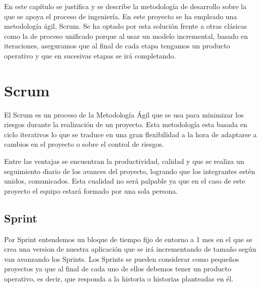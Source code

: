 En este capítulo se justifica y se describe la metodología de desarrollo sobre la que se apoya el proceso de ingeniería. En este proyecto se ha empleado una metodología ágil, Scrum. Se ha optado por esta solución frente a otras clásicas como la de proceso unificado porque al usar un modelo incremental, basado en iteraciones, aseguramos que al final de cada etapa tengamos un producto operativo y que en sucesivas etapas se irá completando.



\section{Scrum}

El Scrum es un proceso de la Metodología Ágil que se usa para minimizar los riesgos durante la realización de un proyecto. 
Esta metodología esta basada en ciclo iterativos lo que se traduce en una gran flexibilidad a la hora de adaptarse a cambios en el proyecto o sobre el control de riesgos. 



Entre las ventajas se encuentran la productividad, calidad y que se realiza un seguimiento diario de los avances del proyecto, logrando que los integrantes estén unidos, comunicados. Esta cualidad no será palpable ya que en el caso de este proyecto el equipo estará formado por una sola persona.\\

\subsection{Sprint}

Por Sprint entendemos un bloque de tiempo fijo de entorno a 1 mes en el que
se crea una version de nuestra aplicación que se irá incrementando de tamaño
según van avanzando los Sprints. Los Sprints se pueden considerar como pequeños
proyectos ya que al final de cada uno de ellos debemos tener un producto
operativo, es decir, que responda a la historia o historias planteadas en él.



